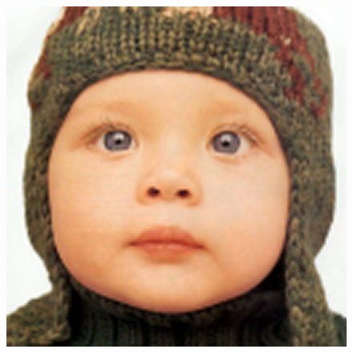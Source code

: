 \documentclass[12pt, a4paper, oneside]{ctexbook}
\begin{document}
\begin{figure}[h]
{			\includegraphics[scale=0.35]{./pic/bicubic-1.png}
		}
		\quad
		\quad
\end{figure}
\end{document}
